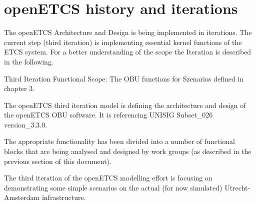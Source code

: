 \section{openETCS history and iterations}
The openETCS Architecture and Design is being implemented in iterations. The current step (third iteration) is implementing essential kernel functions of the ETCS system. 
For a better understanding of the scope the Iteration is described in the following.

Third Iteration Functional Scope: The OBU functions for Szenarios defined in chapter 3.

The openETCS third iteration model is defining the architecture and design of the openETCS OBU software. 
It is referencing  \cite{subset-026} UNISIG Subset\_026 version\_3.3.0. 

The appropriate functionality has been divided into a number of functional blocks that are being analysed and designed by work groups (as described in the previous section of this document).

The third iteration of the openETCS modelling effort is focusing on demonstrating some simple scenarios on the actual (for now simulated) Utrecht- Amsterdam infrastructure.
